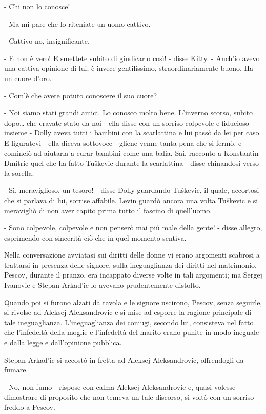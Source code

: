 - Chi non lo conosce! 

- Ma mi pare che lo riteniate un uomo cattivo. 

- Cattivo no, insignificante. 

- E non è vero! E smettete subito di giudicarlo così! - disse Kitty. - Anch'io avevo una cattiva opinione di lui; è invece gentilissimo, straordinariamente buono. Ha un cuore d'oro. 

- Com'è che avete potuto conoscere il suo cuore? 

- Noi siamo stati grandi amici. Lo conosco molto bene. L'inverno scorso, subito dopo\ldots{} che eravate stato da noi - ella disse con un sorriso colpevole e fiducioso insieme - Dolly aveva tutti i bambini con la scarlattina e lui passò da lei per caso. E figuratevi - ella diceva sottovoce - gliene venne tanta pena che si fermò, e cominciò ad aiutarla a curar bambini come una balia. Sai, racconto a Konstantin Dmitric quel che ha fatto Tuškevic durante la scarlattina - disse chinandosi verso la sorella. 

- Sì, meraviglioso, un tesoro! - disse Dolly guardando Tuškevic, il quale, accortosi che si parlava di lui, sorrise affabile. Levin guardò ancora una volta Tuškevic e si meravigliò di non aver capito prima tutto il fascino di quell'uomo. 

- Sono colpevole, colpevole e non penserò mai più male della gente! - disse allegro, esprimendo con sincerità ciò che in quel momento sentiva. 

Nella conversazione avviatasi sui diritti delle donne vi erano argomenti scabrosi a trattarsi in presenza delle signore, sulla ineguaglianza dei diritti nel matrimonio. Pescov, durante il pranzo, era incappato diverse volte in tali argomenti; ma Sergej Ivanovic e Stepan Arkad'ic lo avevano prudentemente distolto. 

Quando poi si furono alzati da tavola e le signore uscirono, Pescov, senza seguirle, si rivolse ad Aleksej Aleksandrovic e si mise ad esporre la ragione principale di tale ineguaglianza. L'ineguaglianza dei coniugi, secondo lui, consisteva nel fatto che l'infedeltà della moglie e l'infedeltà del marito erano punite in modo ineguale e dalla legge e dall'opinione pubblica. 

Stepan Arkad'ic si accostò in fretta ad Aleksej Aleksandrovic, offrendogli da fumare. 

- No, non fumo - rispose con calma Aleksej Aleksandrovic e, quasi volesse dimostrare di proposito che non temeva un tale discorso, si voltò con un sorriso freddo a Pescov. 


